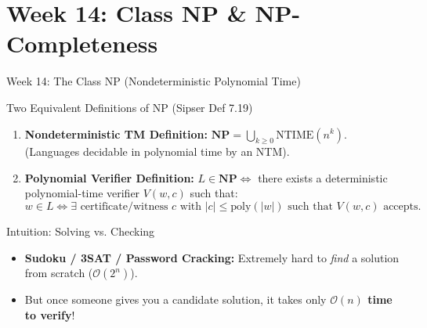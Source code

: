 \documentclass[aspectratio=169,10pt]{beamer}
\begin{document}
\section{Week 14: Class NP \& NP-Completeness}

\begin{frame}{Week 14: The Class NP (Nondeterministic Polynomial Time)}
    \begin{block}{Two Equivalent Definitions of NP (Sipser Def 7.19)}
        \begin{enumerate}
            \item \textbf{Nondeterministic TM Definition:} $\mathbf{NP} = \bigcup_{k \ge 0} \text{NTIME}(n^k)$. (Languages decidable in polynomial time by an NTM).
            \item \textbf{Polynomial Verifier Definition:} $L \in \mathbf{NP} \iff$ there exists a deterministic polynomial-time verifier $V(w, c)$ such that:
            $$w \in L \iff \exists \text{ certificate/witness } c \text{ with } |c| \le \text{poly}(|w|) \text{ such that } V(w, c) \text{ accepts}.$$
        \end{enumerate}
    \end{block}
    
    \begin{exampleblock}{Intuition: Solving vs. Checking}
        \begin{itemize}
            \item \textbf{Sudoku / 3SAT / Password Cracking:} Extremely hard to \textit{find} a solution from scratch ($\mathcal{O}(2^n)$).
            \item But once someone gives you a candidate solution, it takes only \textbf{$\mathcal{O}(n)$ time to verify}!
        \end{itemize}
    \end{exampleblock}
\end{frame}
\end{document}

